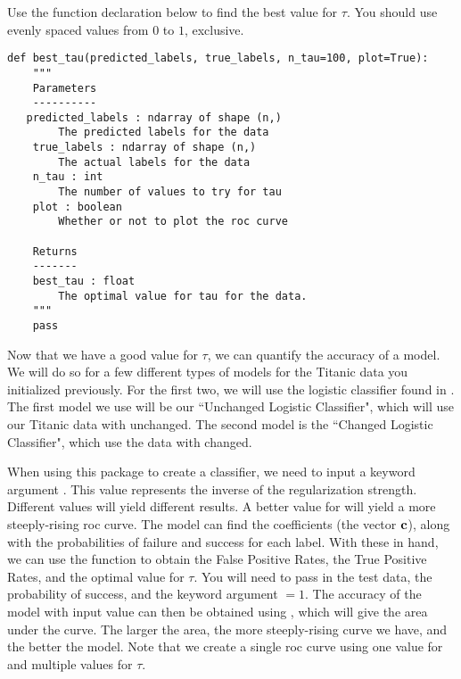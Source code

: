 \begin{problem}
Use the function declaration below to find the best value for $\tau$.  You should use evenly spaced values from $0$ to $1$, exclusive.
\begin{lstlisting}
def best_tau(predicted_labels, true_labels, n_tau=100, plot=True):
    """
    Parameters
    ----------
   predicted_labels : ndarray of shape (n,)
        The predicted labels for the data
    true_labels : ndarray of shape (n,)
        The actual labels for the data
    n_tau : int
        The number of values to try for tau
    plot : boolean
        Whether or not to plot the roc curve

    Returns
    -------
    best_tau : float
        The optimal value for tau for the data.
    """
    pass
\end{lstlisting}
\end{problem}

Now that we have a good value for $\tau$, we can quantify the accuracy of a model. We will do so for a few different types of models for the Titanic data you initialized previously.  For the first two, we will use the logistic classifier found in .  The first model we use will be our ``Unchanged Logistic Classifier", which will use our Titanic data with  unchanged.  The second model is the ``Changed Logistic Classifier", which use the data with  changed.

When using this package to create a classifier, we need to input a keyword argument .  This value represents the inverse of the regularization strength.  Different values will yield different results.  A better value for  will yield a more steeply-rising roc curve.  The model can find the coefficients (the vector $\bf{c}$), along with the probabilities of failure and success for each label.  With these in hand, we can use the function  to obtain the False Positive Rates, the True Positive Rates, and the optimal value for $\tau$.  You will need to pass in the test data, the probability of success, and the keyword argument  $= 1$.  The accuracy of the model with input value  can then be obtained using , which will give the area under the curve.  The larger the area, the more steeply-rising curve we have, and the better the model.  Note that we create a single roc curve using one value for  and multiple values for $\tau$.

